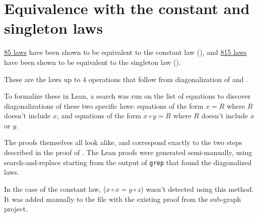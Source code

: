 \chapter{Equivalence with the constant and singleton laws}\label{constant-chapter}

\href{https://github.com/teorth/equational_theories/blob/main/equational_theories/Generated/Constant.lean}{85 laws}
have been shown to be equivalent to the constant law (), and
\href{https://github.com/teorth/equational_theories/blob/main/equational_theories/Generated/Singleton.lean}{815 laws}
have been shown to be equivalent to the singleton law ().

These are the laws up to 4 operations that follow from diagonalization of  and .

To formalize these in Lean, a search was run on the list of equations to discover
diagonalizations of these two specific laws: equations of the form $x = R$ where $R$ doesn't include
$x$, and equations of the form $x \circ y = R$ where $R$ doesn't include $x$ or $y$.

The proofs themselves all look alike, and correspond exactly to the two steps described in the proof
of . The Lean proofs were generated semi-manually, using search-and-replace starting from
the output of \texttt{grep} that found the diagonalized laws.

In the case of the constant law,  ($x \circ x = y \circ z$) wasn't detected using
this method. It was added manually to the file with the existing proof from the sub-graph project.
